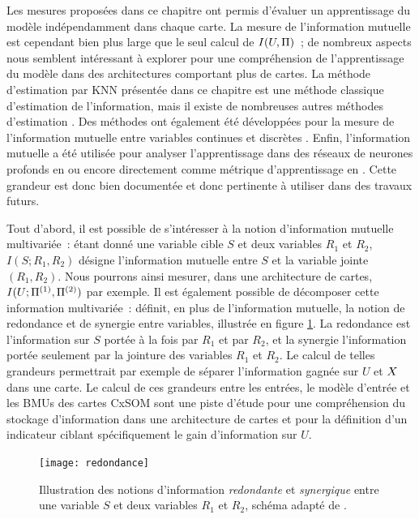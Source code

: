 \documentclass[../main]{subfiles}
\begin{document}
Les mesures proposées dans ce chapitre ont permis d'évaluer un apprentissage du modèle indépendamment dans chaque carte.
La mesure de l'information mutuelle est cependant bien plus large que le seul calcul de $I(U,\Pi)$~; de nombreux aspects nous semblent intéressant à explorer pour une compréhension de l'apprentissage du modèle dans des architectures comportant plus de cartes. 
La méthode d'estimation par KNN présentée dans ce chapitre est une méthode classique d'estimation de l'information, mais il existe de nombreuses autres méthodes d'estimation \cite{Doquire2012ACO}. Des méthodes ont également été développées pour la mesure de l'information mutuelle entre variables continues et discrètes \cite{ross_mutual_2014, Gao2017EstimatingMI}. Enfin, l'information mutuelle a été utilisée pour analyser l'apprentissage dans des réseaux de neurones profonds en \cite{ShwartzZiv2017OpeningTB} ou encore directement comme métrique d'apprentissage en \cite{Hjelm2018LearningDR}.
Cette grandeur est donc bien documentée et donc pertinente à utiliser dans des travaux futurs.

Tout d'abord, il est possible de s'intéresser à la notion d'information mutuelle multivariée~: étant donné une variable cible $S$ et deux variables $R_1$ et $R_2$, $I(S;R_1,R_2)$ désigne l'information mutuelle entre $S$ et la variable jointe $(R_1,R_2)$. Nous pourrons ainsi mesurer, dans une architecture de cartes, $I(U; \Pi^{({1})}, \Pi^{({2})})$ par exemple.
Il est également possible de décomposer cette information multivariée~: \cite{williams_nonnegative_2010} définit, en plus de l'information mutuelle, la notion de redondance et de synergie entre variables, illustrée en figure \ref{fig:redondance}.
La redondance est l'information sur $S$ portée à la fois par $R_1$ et par $R_2$, et la synergie l'information portée seulement par la jointure des variables $R_1$ et $R_2$. Le calcul de telles grandeurs permettrait par exemple de séparer l'information gagnée sur $U$ et $X$ dans une carte.
Le calcul de ces grandeurs entre les entrées, le modèle d'entrée et les BMUs des cartes CxSOM sont une piste d'étude pour une compréhension du stockage d'information dans une architecture de cartes et pour la définition d'un indicateur ciblant spécifiquement le gain d'information sur $U$.

\begin{figure}
    \centering\texttt{[image: redondance]}
    \caption{Illustration des notions d'information \emph{redondante} et \emph{synergique} entre une variable $S$ et deux variables $R_1$ et $R_2$, schéma adapté de \cite{williams_nonnegative_2010}. \label{fig:redondance}
    }
\end{figure}
    
\end{document}

